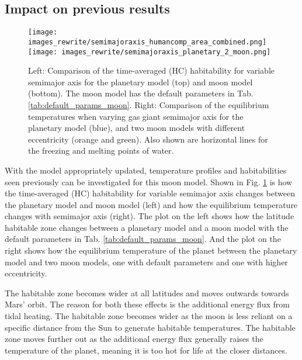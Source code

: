 \documentclass[12pt, onecolumn]{revtex4-2}    %
\begin{document}
\subsection{Impact on previous results}
%
\begin{figure}[t]
  \texttt{[image: images\_rewrite/semimajoraxis\_humancomp\_area\_combined.png]}
  \texttt{[image: images\_rewrite/semimajoraxis\_planetary\_2\_moon.png]}
  \caption{
    Left: Comparison of the time-averaged (HC) habitability for variable semimajor axis for the planetary model (top) and moon model (bottom). 
    The moon model has the default parameters in Tab. \ref{tab:default_params_moon}.
    Right: Comparison of the equilibrium temperatures when varying gas giant semimajor axis for the planetary model (blue), and two moon models with different eccentricity (orange and green).
    Also shown are horizontal lines for the freezing and melting points of water.
  }
  \label{fig:semimajoraxiscomparision}
\end{figure}

With the model appropriately updated, temperature profiles and habitabilities seen previously can be investigated for this moon model.
Shown in Fig. \ref{fig:semimajoraxiscomparision} is how the time-averaged (HC) habitability for variable semimajor axis changes between the planetary model and moon model (left) and how the equilibrium temperature changes with semimajor axis (right). 
The plot on the left shows how the latitude habitable zone changes between a planetary model and a moon model with the default parameters in Tab. \ref{tab:default_params_moon}.
And the plot on the right shows how the equilibrium temperature of the planet between the planetary model and two moon models, one with default parameters and one with higher eccentricity.

The habitable zone becomes wider at all latitudes and moves outwards towards Mars' orbit.
The reason for both these effects is the additional energy flux from tidal heating.
The habitable zone becomes wider as the moon is less reliant on a specific distance from the Sun to generate habitable temperatures.
The habitable zone moves further out as the additional energy flux generally raises the temperature of the planet, meaning it is too hot for life at the closer distances.
\end{document}
